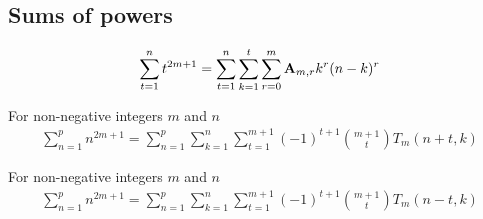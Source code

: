 \subsection{Sums of powers}\label{subsec:sums-of-powers}
\begin{proposition}
    \label{prop:sum-of-odd-powers}
    \begin{align*}
        \sum_{t=1}^{n} t^{2m+1} = \sum_{t=1}^{n} \sum_{k=1}^{t} \sum_{r=0}^{m} {\mathbf{A}} \sb{m,r} k^r (n-k)^r
    \end{align*}
\end{proposition}

\begin{proposition}
    \label{prop:sum-odd-power-decomposition-forward}
    For non-negative integers $m$ and $n$
    \begin{align*}
        \sum_{n=1}^{p} n^{2m+1} = \sum_{n=1}^{p} \sum_{k=1}^{n} \sum_{t=1}^{m+1} (-1)^{t+1} \binom{m+1}{t} T_{m} (n+t, k)
    \end{align*}
\end{proposition}

\begin{proposition}
    \label{prop:sum-odd-power-decomposition-backward}
    For non-negative integers $m$ and $n$
    \begin{align*}
        \sum_{n=1}^{p} n^{2m+1} = \sum_{n=1}^{p} \sum_{k=1}^{n} \sum_{t=1}^{m+1} (-1)^{t+1} \binom{m+1}{t} T_{m} (n-t, k)
    \end{align*}
\end{proposition}

